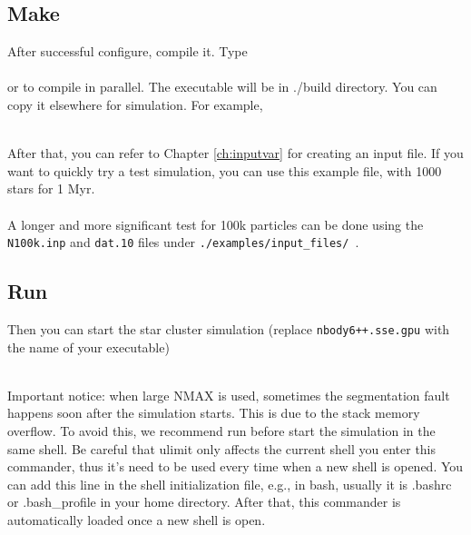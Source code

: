\subsection*{Make}

After successful configure, compile it. Type \\

 \\

or  to compile in parallel. The executable will be in ./build directory. You can copy it elsewhere for simulation. For example,\\


 \\

After that, you can refer to Chapter \ref{ch:inputvar} for creating an input file. If you want to quickly try a test simulation, you can use this example file, with 1000 stars for 1 Myr. \\ 

 \\ 

A longer and more significant test for 100k particles can be done using the {\tt N100k.inp} and {\tt dat.10} files under {\tt ./examples/input\_files/ }.

\subsection*{Run}

Then you can start the star cluster simulation (replace {\tt nbody6++.sse.gpu} with the name of your executable) \\


 \\


Important notice: when large NMAX is used, sometimes the segmentation fault happens soon after the simulation starts. This is due to the stack memory overflow. To avoid this, we recommend run 
before start the simulation in the same shell. Be careful that ulimit only affects the current shell you enter this commander, thus it's need to be used every time when a new shell is opened. You can add this line in the shell initialization file, e.g., in bash, usually it is .bashrc or .bash\_profile in your home directory. After that, this commander is automatically loaded once a new shell is open.

